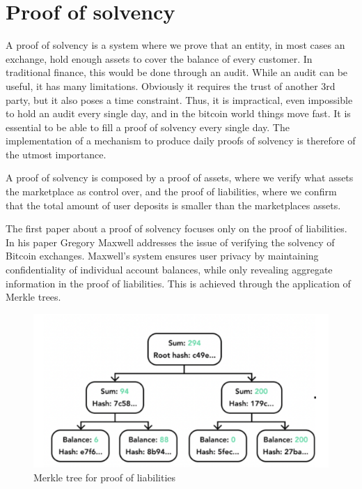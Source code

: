 





\section{Proof of solvency}


A proof of solvency is a system where we prove that an entity, in most cases an exchange, hold enough assets to cover
the balance of every customer. In traditional finance, this would be done through an audit. While an audit can be useful,
it has many limitations. Obviously it requires the trust of another 3rd party, but it also poses a time constraint. Thus, it is impractical, even impossible
to hold an audit every single day, and in the bitcoin world things move fast. It is essential to be able to fill a proof of solvency every single day.
The implementation of a mechanism to produce daily proofs of solvency is therefore of the utmost importance.


A proof of solvency is composed by a proof of assets, where we verify what assets the marketplace as control over, and the proof of liabilities,
where we confirm that the total amount of user deposits is smaller than the marketplaces assets.




The first paper about a proof of solvency focuses only on the proof of liabilities. In his paper Gregory Maxwell addresses the issue of verifying
the solvency of Bitcoin exchanges. \cite{chainlink_blog}
Maxwell's system ensures user privacy by maintaining confidentiality of individual account balances, while only revealing aggregate information in the proof of liabilities.
This is achieved through the application of Merkle trees.


\begin{figure}[H]
   \centering
   \includegraphics[width=130mm]{MerkleTreeLiabilities.png}
   \caption{Merkle tree for proof of liabilities}
   \label{overflow}
   \end{figure}


